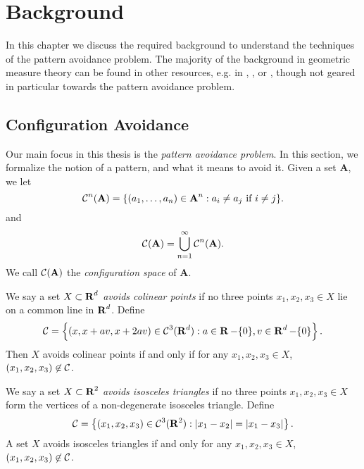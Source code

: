 
\chapter{Background}
\label{ch:Background}

In this chapter we discuss the required background to understand the techniques of the pattern avoidance problem. The majority of the background in geometric measure theory can be found in other resources, e.g. in \cite{Falconer}, \cite{MattilaGeomMeasure}, or \cite{TaoHausdorff}, though not geared in particular towards the pattern avoidance problem.

\section{Configuration Avoidance}

Our main focus in this thesis is the \emph{pattern avoidance problem}. In this section, we formalize the notion of a pattern, and what it means to avoid it. Given a set $\mathbf{A}$, we let
%
\[ \operatorname{\mathcal{C}}^n(\operatorname{\mathbf{A}}) = \{ (a_1, \dots, a_n) \in \operatorname{\mathbf{A}}^n: a_i \neq a_j\ \text{if $i \neq j$} \}. \]
%
and
%
\[ \operatorname{\mathcal{C}}(\operatorname{\mathbf{A}}) = \bigcup_{n = 1}^\infty \operatorname{\mathcal{C}}^n(\operatorname{\mathbf{A}}). \]
%
We call $\operatorname{\mathcal{C}}(\operatorname{\mathbf{A}})$ the \emph{configuration space} of $\mathbf{A}$.

\begin{example}
	We say a set $X \subset \operatorname{\mathbf{R}}^d$ \emph{avoids colinear points} if no three points $x_1,x_2,x_3 \in X$ lie on a common line in $\operatorname{\mathbf{R}}^d$. Define
	\[ \operatorname{\mathcal{C}} = \left\{ (x, x + av, x + 2av) \in \operatorname{\mathcal{C}}^3(\operatorname{\mathbf{R}}^d) : a \in \operatorname{\mathbf{R}} - \{ 0 \}, v \in \operatorname{\mathbf{R}}^d - \{ 0 \} \right\}. \]
	Then $X$ avoids colinear points if and only if for any $x_1,x_2,x_3 \in X$, $(x_1,x_2,x_3) \not \in \operatorname{\mathcal{C}}$.
\end{example}

\begin{example}
	We say a set $X \subset \operatorname{\mathbf{R}}^2$ \emph{avoids isosceles triangles} if no three points $x_1,x_2,x_3 \in X$ form the vertices of a non-degenerate isosceles triangle. Define
	\[ \operatorname{\mathcal{C}} = \left\{ (x_1, x_2, x_3) \in \operatorname{\mathcal{C}}^3(\operatorname{\mathbf{R}}^2) : |x_1-x_2| = |x_1-x_3| \right\}. \]
	A set $X$ avoids isosceles triangles if and only for any $x_1,x_2,x_3 \in X$, $(x_1,x_2,x_3) \not \in \operatorname{\mathcal{C}}$. %
\end{example}

